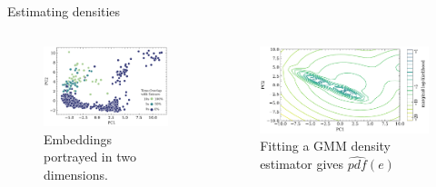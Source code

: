 \documentclass[t]{beamer}
\theoremstyle{definition}
\begin{document}
\begin{frame}{Estimating densities}
\begin{columns}[t]
    \begin{column}{0.45\textwidth}
       
    \begin{figure}
            \centering
            \includegraphics[width=\textwidth]{figs/embeddings_double.pdf}
            \caption{Embeddings portrayed in two dimensions.}
            \label{fig:my_label}
        \end{figure}        
    \end{column}
    \begin{column}{0.55\textwidth}

    \begin{figure}
            \centering
            \includegraphics[width=\textwidth]{figs/de_pc1_pc2.pdf}
            \caption{Fitting a GMM density estimator gives $\hat{pdf}(e)$}
            \label{fig:my_label}
        \end{figure}
        
        
    \end{column}
    \end{columns}

    
\end{frame}
\end{document}

